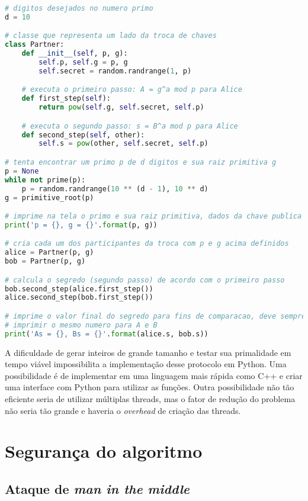 \documentclass[12pt]{article}
\begin{document}
\begin{lstlisting}[language=Python]
# digitos desejados no numero primo
d = 10

# classe que representa um lado da troca de chaves
class Partner:
    def __init__(self, p, g):
        self.p, self.g = p, g
        self.secret = random.randrange(1, p)

    # executa o primeiro passo: A = g^a mod p para Alice
    def first_step(self):
        return pow(self.g, self.secret, self.p)

    # executa o segundo passo: s = B^a mod p para Alice
    def second_step(self, other):
        self.s = pow(other, self.secret, self.p)

# tenta encontrar um primo p de d digitos e sua raiz primitiva g
p = None
while not prime(p):
    p = random.randrange(10 ** (d - 1), 10 ** d)
g = primitive_root(p)

# imprime na tela o primo e sua raiz primitiva, dados da chave publica
print('p = {}, g = {}'.format(p, g))

# cria cada um dos participantes da troca com p e g acima definidos
alice = Partner(p, g)
bob = Partner(p, g)

# calcula o segredo (segundo passo) de acordo com o primeiro passo
bob.second_step(alice.first_step())
alice.second_step(bob.first_step())

# imprime o valor final do segredo para fins de comparacao, deve sempre
# imprimir o mesmo numero para A e B
print('As = {}, Bs = {}'.format(alice.s, bob.s))
\end{lstlisting}

A dificuldade de gerar inteiros de grande tamanho e testar sua primalidade em
tempo viável impossibilita a implementação desse protocolo em Python. Uma
possibilidade é de implementar em uma linguagem mais rápida como C++ e criar
uma interface com Python para utilizar as funções. Outra possibilidade não tão
eficiente seria de utilizar múltiplas threads, mas o fator de redução do
problema não seria tão grande e haveria o \textit{overhead} de criação das
threads.

\section{Segurança do algoritmo}

\subsection{Ataque de \textit{man in the middle}}
\end{document}
